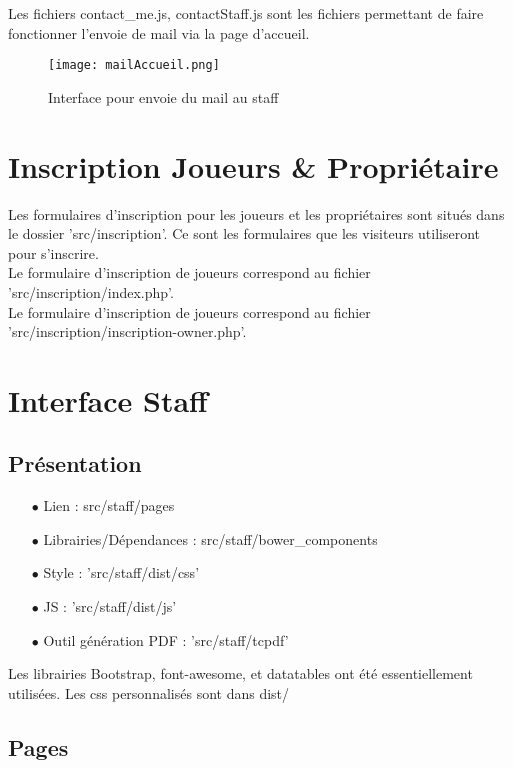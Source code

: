 \documentclass{article}
\begin{document}
Les fichiers contact\_me.js, contactStaff.js sont les fichiers permettant de faire fonctionner l'envoie de mail via la page d'accueil.\\
\begin{figure}[h!]
\centering
\texttt{[image: mailAccueil.png]}
\caption{Interface pour envoie du mail au staff}
\end{figure}

\section{Inscription Joueurs \& Propriétaire}
Les formulaires d'inscription pour les joueurs et les propriétaires sont situés dans le dossier 'src/inscription'. Ce sont les formulaires que les visiteurs utiliseront pour s'inscrire.\\
Le formulaire d'inscription de joueurs correspond au fichier 'src/inscription/index.php'.\\
Le formulaire d'inscription de joueurs correspond au fichier 'src/inscription/inscription-owner.php'.\\


\section{Interface Staff}

\subsection{Présentation}

\begin{itemize}
\item[$\bullet$] Lien : src/staff/pages
\item[$\bullet$] Librairies/Dépendances : src/staff/bower\_components
\item[$\bullet$] Style : 'src/staff/dist/css'
\item[$\bullet$] JS : 'src/staff/dist/js'
\item[$\bullet$] Outil génération PDF : 'src/staff/tcpdf'
\end{itemize}

Les librairies Bootstrap, font-awesome, et datatables ont été essentiellement utilisées.
Les css personnalisés sont dans dist/

\subsection{Pages}
\end{document}
